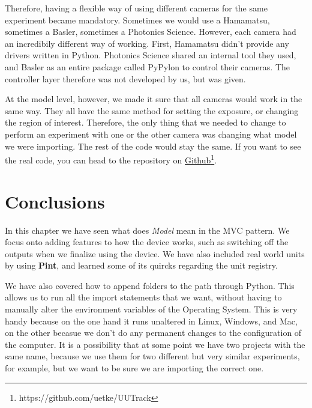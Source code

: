 Therefore, having a flexible way of using different cameras for the same experiment became mandatory. Sometimes we would use a Hamamatsu, sometimes a Basler, sometimes a Photonics Science. However, each camera had an incredibily different way of working. First, Hamamatsu didn't provide any drivers written in Python. Photonics Science shared an internal tool they used, and Basler as an entire package called PyPylon to control their cameras. The controller layer therefore was not developed by us, but was given. 

At the model level, however, we made it sure that all cameras would work in the same way. They all have the same method for setting the exposure, or changing the region of interest. Therefore, the only thing that we needed to change to perform an experiment with one or the other camera was changing what model we were importing. The rest of the code would stay the same. If you want to see the real code, you can head to the repository on \href{https://github.com/uetke/UUTrack/tree/master/UUTrack/Model/Cameras}{Github}\footnote{https://github.com/uetke/UUTrack}. 

\section{Conclusions}\label{conclusions}
In this chapter we have seen what does \emph{Model} mean in the {MVC} pattern. We focus onto adding features to how the device works, such as switching off the outputs when we finalize using the device. We have also included real world units by using \textbf{Pint}, and learned some of its quircks regarding the unit registry. 

We have also covered how to append folders to the path through Python. This allows us to run all the import statements that we want, without having to manually alter the environment variables of the Operating System. This is very handy because on the one hand it runs unaltered in Linux, Windows, and Mac, on the other becasue we don't do any permanent changes to the configuration of the computer. It is a possibility that at some point we have two projects with the same name, because we use them for two different but very similar experiments, for example, but we want to be sure we are importing the correct one. 